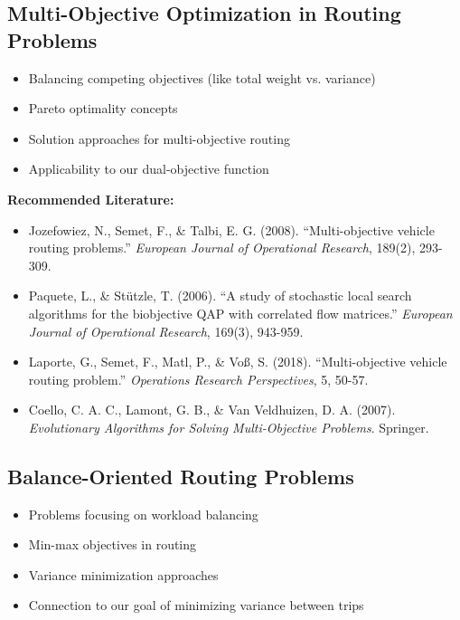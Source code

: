 \subsection{Multi-Objective Optimization in Routing Problems}
\begin{itemize}
    \item Balancing competing objectives (like total weight vs. variance)
    \item Pareto optimality concepts
    \item Solution approaches for multi-objective routing
    \item Applicability to our dual-objective function
\end{itemize}

\noindent\textbf{Recommended Literature:}
\begin{itemize}
    \item Jozefowiez, N., Semet, F., \& Talbi, E. G. (2008). ``Multi-objective vehicle routing problems.'' \textit{European Journal of Operational Research}, 189(2), 293-309.
    \item Paquete, L., \& Stützle, T. (2006). ``A study of stochastic local search algorithms for the biobjective QAP with correlated flow matrices.'' \textit{European Journal of Operational Research}, 169(3), 943-959.
    \item Laporte, G., Semet, F., Matl, P., \& Voß, S. (2018). ``Multi-objective vehicle routing problem.'' \textit{Operations Research Perspectives}, 5, 50-57.
    \item Coello, C. A. C., Lamont, G. B., \& Van Veldhuizen, D. A. (2007). \textit{Evolutionary Algorithms for Solving Multi-Objective Problems}. Springer.
\end{itemize}

\subsection{Balance-Oriented Routing Problems}
\begin{itemize}
    \item Problems focusing on workload balancing
    \item Min-max objectives in routing
    \item Variance minimization approaches
    \item Connection to our goal of minimizing variance between trips
\end{itemize}

